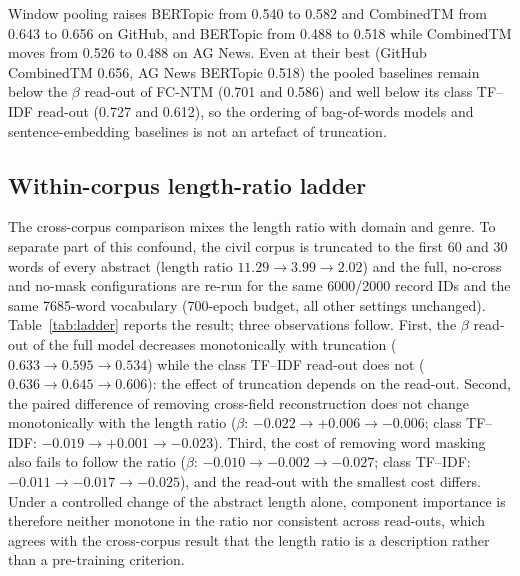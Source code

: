 \documentclass[11pt]{article}
\newcommand{\fcntm}{FC-NTM}
\begin{document}
Window pooling raises BERTopic from 0.540 to 0.582 and CombinedTM from 0.643 to 0.656 on GitHub,
and BERTopic from 0.488 to 0.518 while CombinedTM moves from 0.526 to 0.488 on AG News. Even at
their best (GitHub CombinedTM 0.656, AG News BERTopic 0.518) the pooled baselines remain below the
$\beta$ read-out of \fcntm{} (0.701 and 0.586) and well below its class TF--IDF read-out (0.727 and
0.612), so the ordering of bag-of-words models and sentence-embedding baselines is not an artefact
of truncation.

\subsection{Within-corpus length-ratio ladder}

The cross-corpus comparison mixes the length ratio with domain and genre. To separate part of this
confound, the civil corpus is truncated to the first 60 and 30 words of every abstract (length
ratio $11.29\to3.99\to2.02$) and the full, no-cross and no-mask configurations are re-run for the
same 6000/2000 record IDs and the same 7685-word vocabulary (700-epoch budget, all other settings
unchanged). Table~\ref{tab:ladder} reports the result; three observations follow. First, the
$\beta$ read-out of the full model decreases monotonically with truncation
($0.633\to0.595\to0.534$) while the class TF--IDF read-out does not
($0.636\to0.645\to0.606$): the effect of truncation depends on the read-out. Second, the paired
difference of removing cross-field reconstruction does not change monotonically with the length
ratio ($\beta$: $-0.022\to+0.006\to-0.006$; class TF--IDF: $-0.019\to+0.001\to-0.023$). Third, the
cost of removing word masking also fails to follow the ratio ($\beta$: $-0.010\to-0.002\to-0.027$;
class TF--IDF: $-0.011\to-0.017\to-0.025$), and the read-out with the smallest cost differs. Under
a controlled change of the abstract length alone, component importance is therefore neither
monotone in the ratio nor consistent across read-outs, which agrees with the cross-corpus result
that the length ratio is a description rather than a pre-training criterion.
\end{document}
